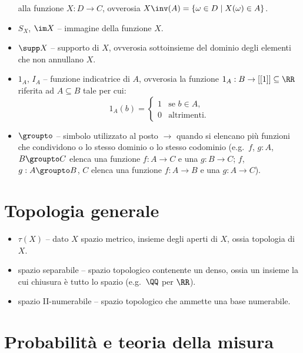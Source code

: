 \begin{multicols*}{2}
\begin{itemize}
        alla funzione $X : D \to C$, ovverosia $X\inv(A) = \{\omega \in D \mid X(\omega) \in A\}$.
        \item $S_X$, $\im X$ -- immagine della funzione $X$.
        \item $\supp X$ -- supporto di $X$, ovverosia sottoinsieme del
        dominio degli elementi che non annullano $X$.
        \item $1_A$, $I_A$ -- funzione indicatrice di $A$, ovverosia la
        funzione $1_A : B \to [[1]] \subseteq \RR$ riferita ad $A \subseteq B$
        tale per cui:
        \[
            1_A(b) = \begin{cases}
                1 & \text{se } b \in A, \\
                0 & \text{altrimenti}.
            \end{cases}
        \]
        \item $\groupto$ -- simbolo utilizzato al posto $\to$ quando si elencano
        più funzioni che condividono o lo stesso dominio o lo stesso codominio (e.g.~$f$, $g : A$, $B \groupto C$ elenca una funzione $f : A \to C$ e una $g : B \to C$; $f$, $g : A \groupto B$, $C$ elenca una funzione
        $f : A \to B$ e una $g : A \to C$).
    \end{itemize}

    \section*{Topologia generale}

    \begin{itemize}
        \item $\tau(X)$ -- dato $X$ spazio metrico, insieme degli aperti di $X$, ossia topologia di $X$.
        \item spazio separabile -- spazio topologico contenente un denso, ossia un insieme la cui chiusura è tutto lo spazio (e.g.~$\QQ$ per $\RR$).
        \item spazio II-numerabile -- spazio topologico che ammette una base numerabile.
    \end{itemize}

    \section*{Probabilità e teoria della misura}


\end{multicols*}

